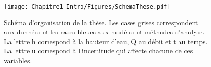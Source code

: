 \begin{figure}[h]
	\centering
	\texttt{[image: Chapitre1\_Intro/Figures/SchemaThese.pdf]}	
	\caption{Schéma d'organisation de la thèse. Les cases grises correspondent aux données et les cases bleues aux modèles et méthodes d'analyse. La lettre h correspond à la hauteur d'eau, Q au débit et t au temps. La lettre u correspond à l'incertitude qui affecte chacune de ces variables.}
	\label{fig:SchemaThese}
\end{figure}

\FloatBarrier

%
